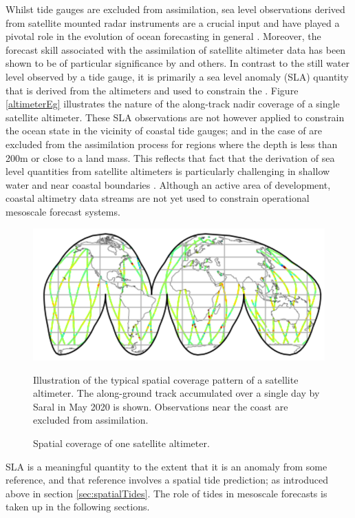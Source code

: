 Whilst tide gauges are excluded from assimilation, sea level observations derived from satellite mounted radar instruments are a crucial input and have played a pivotal role in the evolution of ocean forecasting in general \citep{Fu:2001ub}.  Moreover, the forecast skill associated with the assimilation of satellite altimeter data has been shown to be of particular significance by  \citep{10.5194/os-13-1077-2017} and others.
In contrast to the still water level observed by a tide gauge, it is primarily a sea level anomaly (SLA) quantity that is derived from the altimeters and used to constrain the \OGCM{}. Figure \ref{altimeterEg} illustrates the nature of the along-track nadir coverage of a single satellite altimeter.
These SLA observations are not however applied to constrain the ocean state in the vicinity of coastal tide gauges; and in the case of \BL{} are excluded from the assimilation process for regions where the depth is less than 200m or close to a land mass.   This reflects that fact that the derivation of sea level quantities from satellite altimeters is particularly challenging in shallow water and near coastal boundaries \citep{Woodworth:2011bf}.    Although an active area of development, coastal altimetry data streams are not yet used to constrain operational mesoscale forecast  systems.
\begin{figure}[h]\centering
  \includegraphics[width=\figwidthHalf]{figures/maps/altimeterCoverageEg.png}
  \caption{Spatial coverage of one satellite altimeter.}
          {Illustration of the typical spatial coverage pattern of a satellite altimeter. The along-ground track accumulated over a single day by Saral in May 2020 is shown. Observations near the coast are excluded from assimilation.}
  \label{fig:altimeterEg}
\end{figure}
SLA is a meaningful quantity to the extent that it is an anomaly from some reference, and that reference involves a spatial tide prediction; as introduced above in section \ref{sec:spatialTides}.
The role of tides in mesoscale forecasts is taken up in the following sections.
